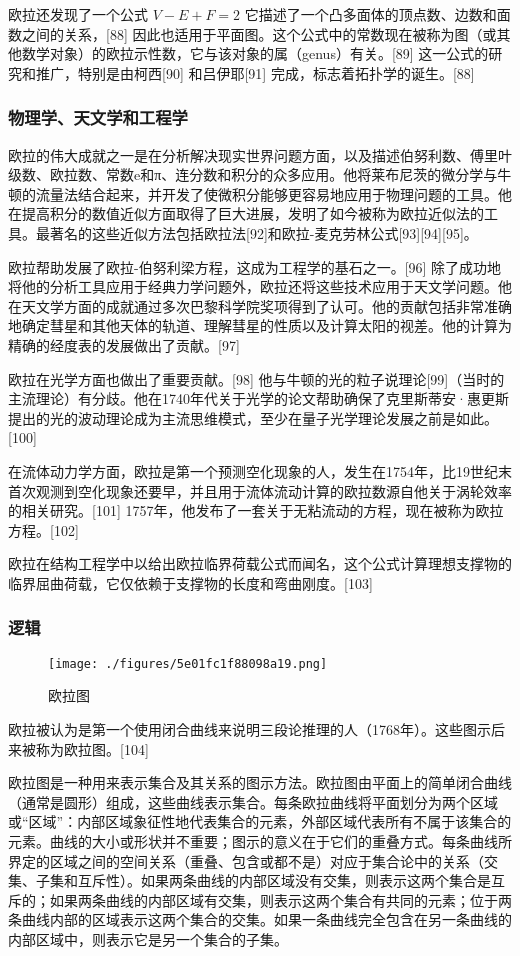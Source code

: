 欧拉还发现了一个公式  
\( V - E + F = 2 \)  
它描述了一个凸多面体的顶点数、边数和面数之间的关系，[88] 因此也适用于平面图。这个公式中的常数现在被称为图（或其他数学对象）的欧拉示性数，它与该对象的属（genus）有关。[89] 这一公式的研究和推广，特别是由柯西[90] 和吕伊耶[91] 完成，标志着拓扑学的诞生。[88]
\subsubsection{物理学、天文学和工程学}
欧拉的伟大成就之一是在分析解决现实世界问题方面，以及描述伯努利数、傅里叶级数、欧拉数、常数e和π、连分数和积分的众多应用。他将莱布尼茨的微分学与牛顿的流量法结合起来，并开发了使微积分能够更容易地应用于物理问题的工具。他在提高积分的数值近似方面取得了巨大进展，发明了如今被称为欧拉近似法的工具。最著名的这些近似方法包括欧拉法[92]和欧拉-麦克劳林公式[93][94][95]。

欧拉帮助发展了欧拉-伯努利梁方程，这成为工程学的基石之一。[96] 除了成功地将他的分析工具应用于经典力学问题外，欧拉还将这些技术应用于天文学问题。他在天文学方面的成就通过多次巴黎科学院奖项得到了认可。他的贡献包括非常准确地确定彗星和其他天体的轨道、理解彗星的性质以及计算太阳的视差。他的计算为精确的经度表的发展做出了贡献。[97]

欧拉在光学方面也做出了重要贡献。[98] 他与牛顿的光的粒子说理论[99]（当时的主流理论）有分歧。他在1740年代关于光学的论文帮助确保了克里斯蒂安·惠更斯提出的光的波动理论成为主流思维模式，至少在量子光学理论发展之前是如此。[100]

在流体动力学方面，欧拉是第一个预测空化现象的人，发生在1754年，比19世纪末首次观测到空化现象还要早，并且用于流体流动计算的欧拉数源自他关于涡轮效率的相关研究。[101] 1757年，他发布了一套关于无粘流动的方程，现在被称为欧拉方程。[102]

欧拉在结构工程学中以给出欧拉临界荷载公式而闻名，这个公式计算理想支撑物的临界屈曲荷载，它仅依赖于支撑物的长度和弯曲刚度。[103]
\subsubsection{逻辑}
\begin{figure}[ht]
\centering
\texttt{[image: ./figures/5e01fc1f88098a19.png]}
\caption{欧拉图} \label{fig_OL1_5}
\end{figure}
欧拉被认为是第一个使用闭合曲线来说明三段论推理的人（1768年）。这些图示后来被称为欧拉图。[104]

欧拉图是一种用来表示集合及其关系的图示方法。欧拉图由平面上的简单闭合曲线（通常是圆形）组成，这些曲线表示集合。每条欧拉曲线将平面划分为两个区域或“区域”：内部区域象征性地代表集合的元素，外部区域代表所有不属于该集合的元素。曲线的大小或形状并不重要；图示的意义在于它们的重叠方式。每条曲线所界定的区域之间的空间关系（重叠、包含或都不是）对应于集合论中的关系（交集、子集和互斥性）。如果两条曲线的内部区域没有交集，则表示这两个集合是互斥的；如果两条曲线的内部区域有交集，则表示这两个集合有共同的元素；位于两条曲线内部的区域表示这两个集合的交集。如果一条曲线完全包含在另一条曲线的内部区域中，则表示它是另一个集合的子集。

